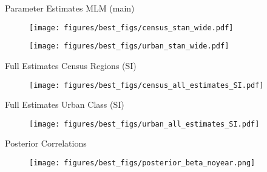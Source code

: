 \documentclass[pdf]{beamer}
\begin{document}
\begin{frame}{Parameter Estimates MLM (main)}

\vspace{-0.4cm}

\begin{figure}[ht]
\begin{center}
\texttt{[image: figures/best\_figs/census\_stan\_wide.pdf]}
\end{center}
\end{figure}

\vspace{-0.8cm}

\begin{figure}[ht]
\begin{center}
\texttt{[image: figures/best\_figs/urban\_stan\_wide.pdf]}
\end{center}
\end{figure}

\end{frame}


\begin{frame}{Full Estimates Census Regions (SI)}
\begin{figure}[ht]
\begin{center}
\texttt{[image: figures/best\_figs/census\_all\_estimates\_SI.pdf]}
\end{center}
\end{figure}
\end{frame}


\begin{frame}{Full Estimates Urban Class (SI)}
\begin{figure}[ht]
\begin{center}
\texttt{[image: figures/best\_figs/urban\_all\_estimates\_SI.pdf]}
\end{center}
\end{figure}
\end{frame}



\begin{frame}{Posterior Correlations}
\begin{figure}[ht]
\begin{center}
\texttt{[image: figures/best\_figs/posterior\_beta\_noyear.png]}
\end{center}
\end{figure}
\end{frame}

 
\end{document}
